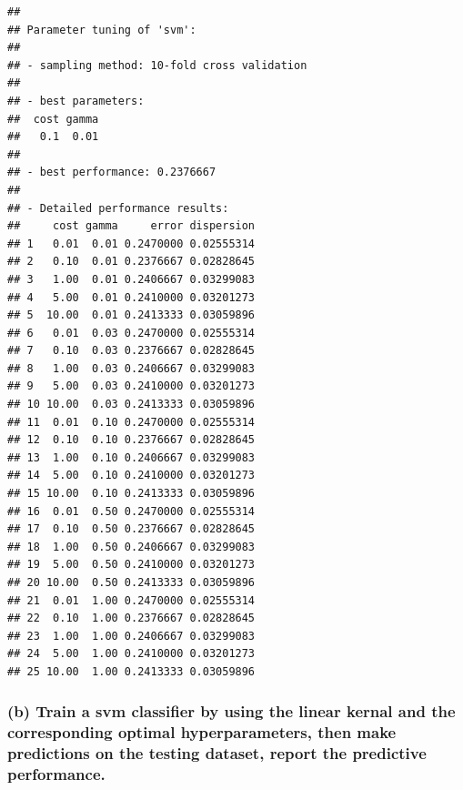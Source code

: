 \documentclass[]{article}
\newenvironment{Shaded}{\begin{snugshade}}{\end{snugshade}}
\newcommand{\CommentTok}[1]{\textcolor[rgb]{0.56,0.35,0.01}{\textit{#1}}}
\newcommand{\DataTypeTok}[1]{\textcolor[rgb]{0.13,0.29,0.53}{#1}}
\newcommand{\DecValTok}[1]{\textcolor[rgb]{0.00,0.00,0.81}{#1}}
\newcommand{\FloatTok}[1]{\textcolor[rgb]{0.00,0.00,0.81}{#1}}
\newcommand{\KeywordTok}[1]{\textcolor[rgb]{0.13,0.29,0.53}{\textbf{#1}}}
\newcommand{\NormalTok}[1]{#1}
\newcommand{\OperatorTok}[1]{\textcolor[rgb]{0.81,0.36,0.00}{\textbf{#1}}}
\newcommand{\StringTok}[1]{\textcolor[rgb]{0.31,0.60,0.02}{#1}}
\begin{document}
\begin{verbatim}
## 
## Parameter tuning of 'svm':
## 
## - sampling method: 10-fold cross validation 
## 
## - best parameters:
##  cost gamma
##   0.1  0.01
## 
## - best performance: 0.2376667 
## 
## - Detailed performance results:
##     cost gamma     error dispersion
## 1   0.01  0.01 0.2470000 0.02555314
## 2   0.10  0.01 0.2376667 0.02828645
## 3   1.00  0.01 0.2406667 0.03299083
## 4   5.00  0.01 0.2410000 0.03201273
## 5  10.00  0.01 0.2413333 0.03059896
## 6   0.01  0.03 0.2470000 0.02555314
## 7   0.10  0.03 0.2376667 0.02828645
## 8   1.00  0.03 0.2406667 0.03299083
## 9   5.00  0.03 0.2410000 0.03201273
## 10 10.00  0.03 0.2413333 0.03059896
## 11  0.01  0.10 0.2470000 0.02555314
## 12  0.10  0.10 0.2376667 0.02828645
## 13  1.00  0.10 0.2406667 0.03299083
## 14  5.00  0.10 0.2410000 0.03201273
## 15 10.00  0.10 0.2413333 0.03059896
## 16  0.01  0.50 0.2470000 0.02555314
## 17  0.10  0.50 0.2376667 0.02828645
## 18  1.00  0.50 0.2406667 0.03299083
## 19  5.00  0.50 0.2410000 0.03201273
## 20 10.00  0.50 0.2413333 0.03059896
## 21  0.01  1.00 0.2470000 0.02555314
## 22  0.10  1.00 0.2376667 0.02828645
## 23  1.00  1.00 0.2406667 0.03299083
## 24  5.00  1.00 0.2410000 0.03201273
## 25 10.00  1.00 0.2413333 0.03059896
\end{verbatim}

\hypertarget{b-train-a-svm-classifier-by-using-the-linear-kernal-and-the-corresponding-optimal-hyperparameters-then-make-predictions-on-the-testing-dataset-report-the-predictive-performance.}{%
\subsubsection{(b) Train a svm classifier by using the linear kernal and
the corresponding optimal hyperparameters, then make predictions on the
testing dataset, report the predictive
performance.}\label{b-train-a-svm-classifier-by-using-the-linear-kernal-and-the-corresponding-optimal-hyperparameters-then-make-predictions-on-the-testing-dataset-report-the-predictive-performance.}}

\begin{Shaded}
\end{Shaded}
\end{document}

